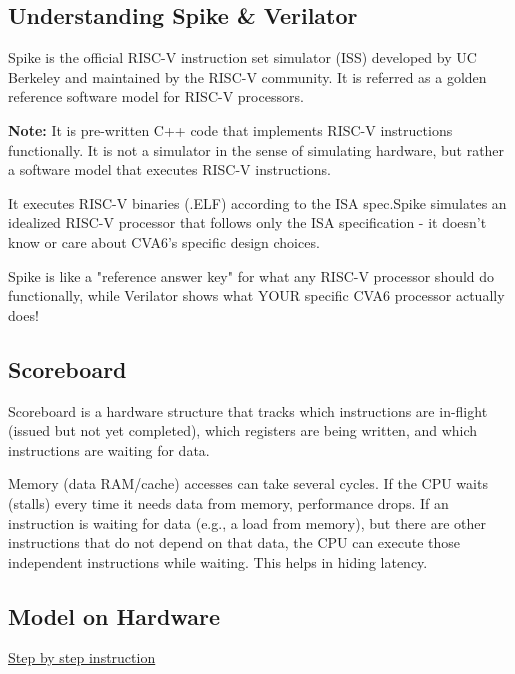 \documentclass[12pt, a4paper]{article}
\begin{document}
\subsection{Understanding Spike \& Verilator}

Spike is the official RISC-V instruction set simulator (ISS) developed by UC Berkeley and maintained by the RISC-V community. It is referred as a golden reference software model for RISC-V processors. 

\vspace{0.5em}

\textbf{Note:} It is pre-written C++ code that implements RISC-V instructions functionally. It is not a simulator in the sense of simulating hardware, but rather a software model that executes RISC-V instructions.

\vspace{0.5em}

It executes RISC-V binaries (.ELF) according to the ISA spec.Spike simulates an idealized RISC-V processor that follows only the ISA specification - it doesn't know or care about CVA6's specific design choices.

Spike is like a "reference answer key" for what any RISC-V processor should do functionally, while Verilator shows what YOUR specific CVA6 processor actually does!

\subsection{Scoreboard}

Scoreboard is a hardware structure that tracks which instructions are in-flight (issued but not yet completed), which registers are being written, and which instructions are waiting for data.

Memory (data RAM/cache) accesses can take several cycles. If the CPU waits (stalls) every time it needs data from memory, performance drops. If an instruction is waiting for data (e.g., a load from memory), but there are other instructions that do not depend on that data, the CPU can execute those independent instructions while waiting. This helps in hiding latency.

\subsection{Model on Hardware}

\href{https://chatgpt.com/share/686529ac-6b08-8005-98f3-5291aa6a2816}{Step by step instruction}
\end{document}

